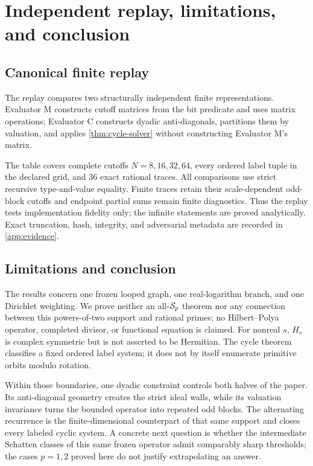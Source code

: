 \section{Independent replay, limitations, and conclusion}
\label{sec:replay}

\subsection{Canonical finite replay}
\label{sec:canonical-replay}

The replay compares two structurally independent finite representations.
Evaluator M constructs cutoff matrices from the bit predicate and uses
matrix operations; Evaluator C constructs dyadic anti-diagonals, partitions
them by valuation, and applies \cref{thm:cycle-solver} without constructing
Evaluator M's matrix.

\begin{table}[H]
  \centering
  \caption{Canonical State-A implementation replay.  These finite exact
  comparisons test two independent implementations; they do not prove an
  infinite theorem or a priority claim.}
  \label{tab:canonical-replay-main}
  \small
  
\end{table}

The table covers complete cutoffs $N=8,16,32,64$, every ordered label tuple
in the declared grid, and $36$ exact rational traces.  All comparisons use
strict recursive type-and-value equality.  Finite traces retain their
scale-dependent odd-block cutoffs and endpoint partial sums remain finite
diagnostics.  Thus the replay tests implementation fidelity only; the
infinite statements are proved analytically.  Exact truncation, hash,
integrity, and adversarial metadata are recorded in \cref{app:evidence}.

\subsection{Limitations and conclusion}
\label{sec:conclusion}

The results concern one frozen looped graph, one real-logarithm branch, and
one Dirichlet weighting.  We prove neither an all-$\mathcal S_{p}$ theorem nor
any connection between this powers-of-two support and rational primes; no
Hilbert--Polya operator, completed divisor, or functional equation is claimed.
For nonreal $s$, $H_s$ is
complex symmetric but is not asserted to be Hermitian.  The cycle theorem
classifies a fixed ordered label system; it does not by itself enumerate
primitive orbits modulo rotation.

Within those boundaries, one dyadic constraint controls both halves of the
paper.  Its anti-diagonal geometry creates the strict ideal walls, while its
valuation invariance turns the bounded operator into repeated odd blocks.
The alternating recurrence is the finite-dimensional counterpart of that
same support and closes every labeled cyclic system.  A concrete next
question is whether the intermediate Schatten classes of this same frozen
operator admit comparably sharp thresholds; the cases $p=1,2$ proved here
do not justify extrapolating an answer.
